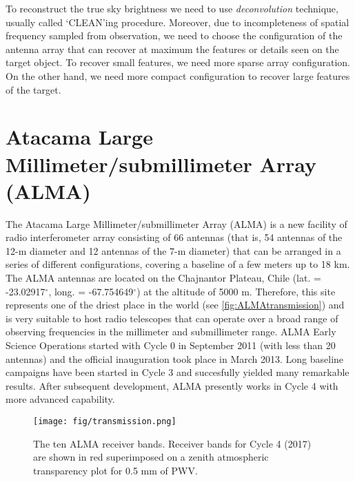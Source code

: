 To reconstruct the true sky brightness we need to use \textit{deconvolution} technique, usually called  `CLEAN'ing procedure. Moreover, due to incompleteness of spatial frequency sampled from observation, we need to choose the configuration of the antenna array that can recover at maximum the features or details seen on the target object. To recover small features, we need more sparse array configuration. On the other hand, we need more compact configuration to recover large features of the target. 


\section{Atacama Large Millimeter/submillimeter Array (ALMA)}

The Atacama Large Millimeter/submillimeter Array (ALMA) is a new facility of radio interferometer array consisting of 66 
antennas (that is, 54 antennas of the 12-m diameter and 12 antennas of the 7-m diameter) that can be arranged in a series of 
different configurations, covering a baseline of a few meters up to 18 km. The ALMA 
antennas are located on the Chajnantor Plateau, Chile (lat. = -23.02917$^{\circ}$, long. = -67.754649$^{\circ}$)
at the altitude of 5000 m. Therefore, this site represents one of the driest place in the world (see \autoref{fig:ALMAtransmission}) 
and is very suitable to host radio telescopes that can
operate over a broad range of observing frequencies in the millimeter and submillimeter range. ALMA Early Science 
Operations started with Cycle 0 in September 2011 (with less than 20 antennas) and the official inauguration took place in March 2013. 
Long baseline campaigns have been started in Cycle 3 and succesfully yielded many remarkable results. After subsequent
development, ALMA presently works in Cycle 4 with more advanced capability. 

\begin{figure}[!ht]
\centering
\texttt{[image: fig/transmission.png]}
\caption[ALMA receiver bands for Cycle 4 (2017)]{The ten ALMA receiver bands. Receiver bands for Cycle 4 (2017) are shown in red superimposed on a zenith atmospheric transparency plot for 0.5 mm of PWV.}
\label{fig:ALMAtransmission}
\end{figure}

